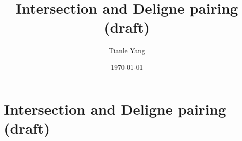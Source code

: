 \documentclass{noteformyself}
\title{Intersection and Deligne pairing (draft)}
\author{Tianle Yang}
\date{\today}
\begin{document}
    \maketitle

    \section{Intersection and Deligne pairing (draft)}

    

\end{document}
